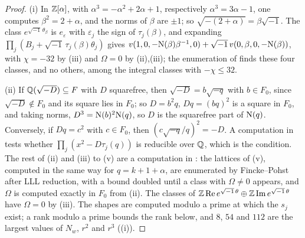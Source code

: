 \begin{proof}
(i) In $\mathbb{Z}[\alpha]$, with $\alpha^{3}=-\alpha^{2}+2\alpha+1$, respectively
$\alpha^{3}=3\alpha-1$, one computes $\beta^{2}=2+\alpha$, and the norms of
$\beta$ are $\pm1$; so $\sqrt{-(2+\alpha)}=\beta\sqrt{-1}$. The class
$e^{\sqrt{-1}\,\theta_{\beta}}$ is $e_{\varepsilon}$ with
$\varepsilon_{j}$ the sign of $\tau_{j}(\beta)$, and expanding
$\prod_{j}(B_{j}+\sqrt{-1}\,\tau_{j}(\beta)\theta_{j})$ gives
$v(1,0,-\mathrm{N}(\beta)\beta^{-1},0)+\sqrt{-1}\,v(0,\beta,0,-\mathrm{N}(\beta))$, with
$\chi=-32$ by (iii) and $\Omega=0$ by
(ii),(iii); the enumeration of \cite{BMB26} finds these
four classes, and no others, among the integral classes with $-\chi\le32$.

(ii) If $\mathbb{Q}(\sqrt{-D})\subseteq F$ with $D$ squarefree, then
$\sqrt{-D}=b\sqrt{-q}$ with $b\in F_{0}$, since
$\sqrt{-D}\notin F_{0}$ and its square lies in $F_{0}$; so $D=b^{2}q$,
$Dq=(bq)^{2}$ is a square in $F_{0}$, and taking norms,
$D^{3}=\mathrm{N}(b)^{2}\mathrm{N}(q)$, so $D$ is the squarefree part of $\mathrm{N}(q)$.
Conversely, if $Dq=c^{2}$ with $c\in F_{0}$, then
$(c\sqrt{-q}/q)^{2}=-D$. A computation in \cite{BMB26} tests whether
$\prod_{j}(x^{2}-D\tau_{j}(q))$ is reducible over $\mathbb{Q}$, which is the
condition. The rest of (ii) and (iii) to (v) are a computation in \cite{BMB26}:
the lattices of (v), computed in the same
way for $q=k+1+\alpha$, are enumerated by Fincke--Pohst after LLL reduction,
with a bound doubled until a class with $\Omega\ne0$ appears, and $\Omega$ is
computed exactly in $F_{0}$ from (ii). The classes of
$\mathbb{Z}\operatorname{Re}e^{\sqrt{-1}\,\theta}\oplus\mathbb{Z}\operatorname{Im}
e^{\sqrt{-1}\,\theta}$ have $\Omega=0$ by (iii). The
shapes are computed modulo a prime at which the $s_{j}$ exist; a rank modulo
a prime bounds the rank below, and $8$, $54$ and $112$ are the largest values
of $N_{w}$, $r^{2}$ and $r^{3}$ ((i)).
\end{proof}

